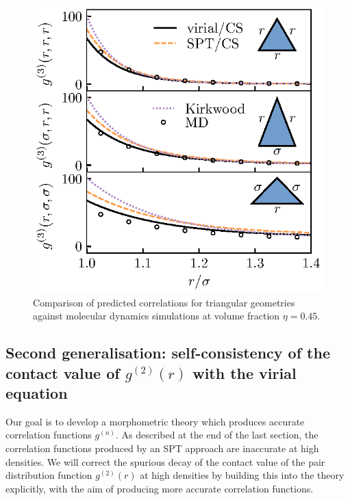 \documentclass[11pt,twoside]{report}
\begin{document}
\begin{figure}
  \includegraphics[width=0.9\linewidth,outer]{g3}
  \caption[Accuracy of triplet distribution functions $g^{(3)}(r,s,t)$]{
    Comparison of predicted correlations for triangular geometries against molecular dynamics simulations at volume fraction $\eta = 0.45$.}
  \label{fig:g3}
\end{figure}

\subsection{Second generalisation: self-consistency of the contact value of $g^{(2)}(r)$ with the virial equation}
\label{sec:virial-spt}

Our goal is to develop a morphometric theory which produces accurate correlation functions $g^{(n)}$.
As described at the end of the last section, the correlation functions produced by an SPT approach are inaccurate at high densities.
We will correct the spurious decay of the contact value of the pair distribution function $g^{(2)}(r)$ at high densities by building this into the theory explicitly, with the aim of producing more accurate correlation functions.

\end{document}
